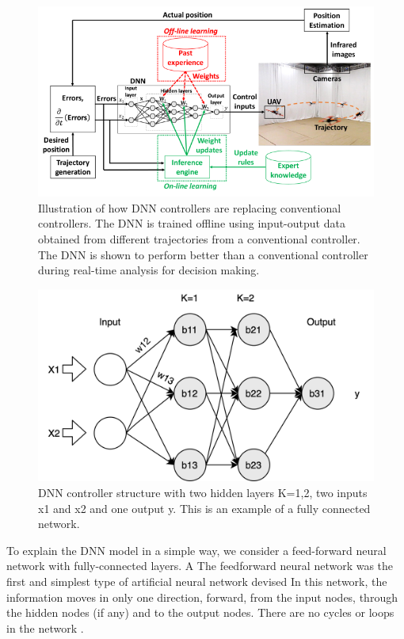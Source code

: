 \begin{figure}
	\centering
	\includegraphics[width=0.7\linewidth]{Images/DNNcontroller}
	\caption{Illustration of how DNN controllers are replacing conventional controllers. The DNN is trained offline using input-output data obtained from different trajectories from a conventional controller. The DNN is shown to perform better than a conventional controller during real-time analysis for decision making.}
	\label{fig:dnncontroller}
\end{figure}

\begin{figure}
	\centering
	\includegraphics[width=0.7\linewidth]{Images/DNNstructure}
	\caption[DNN structure]{DNN controller structure with two hidden layers K=1,2, two inputs x1 and x2 and one output y. This is an example of a fully connected network.}
	\label{fig:dnn-controller}
\end{figure}

To explain the DNN model in a simple way, we consider a feed-forward neural network with fully-connected layers. A The feedforward neural network was the first and simplest type of artificial neural network devised \cite{feedforward} In this network, the information moves in only one direction, forward, from the input nodes, through the hidden nodes (if any) and to the output nodes. There are no cycles or loops in the network \cite{Zell}.

